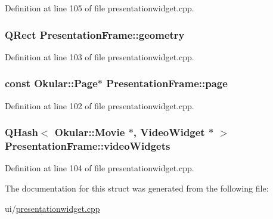 Definition at line 105 of file presentationwidget.\+cpp.

\hypertarget{structPresentationFrame_af80fd4c4305934bb3723aec0b7f72bcf}{
\subsubsection[{geometry}]{\setlength{\rightskip}{0pt plus 5cm}Q\+Rect Presentation\+Frame\+::geometry}}\label{structPresentationFrame_af80fd4c4305934bb3723aec0b7f72bcf}


Definition at line 103 of file presentationwidget.\+cpp.

\hypertarget{structPresentationFrame_ab40e6871a08519f4f2c97d3f1009f2a5}{
\subsubsection[{page}]{\setlength{\rightskip}{0pt plus 5cm}const {\bf Okular\+::\+Page}$\ast$ Presentation\+Frame\+::page}}\label{structPresentationFrame_ab40e6871a08519f4f2c97d3f1009f2a5}


Definition at line 102 of file presentationwidget.\+cpp.

\hypertarget{structPresentationFrame_ace9a73ff662d4d93b3f9d7d22f6630cd}{
\subsubsection[{video\+Widgets}]{\setlength{\rightskip}{0pt plus 5cm}Q\+Hash$<$ {\bf Okular\+::\+Movie} $\ast$, {\bf Video\+Widget} $\ast$ $>$ Presentation\+Frame\+::video\+Widgets}}\label{structPresentationFrame_ace9a73ff662d4d93b3f9d7d22f6630cd}


Definition at line 104 of file presentationwidget.\+cpp.



The documentation for this struct was generated from the following file\+:\begin{DoxyCompactItemize}
\item 
ui/\hyperlink{presentationwidget_8cpp}{presentationwidget.\+cpp}\end{DoxyCompactItemize}
